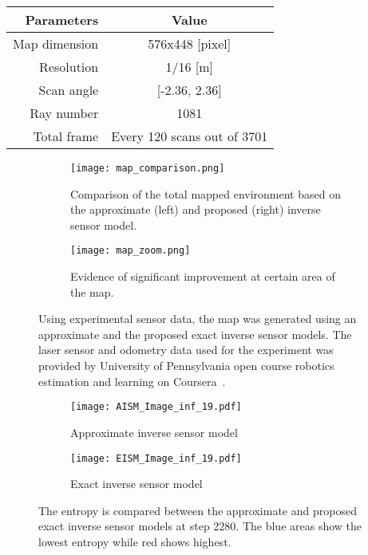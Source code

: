 \begin{center}
\label{tab:penn}
    \begin{tabular}{r | c}
        Parameters & Value\\ \hline\hline
        Map dimension & 576x448 [pixel]\\
        Resolution & 1/16 [m]\\
        Scan angle & [-2.36, 2.36]\\
        Ray number & 1081\\
        Total frame & Every 120 scans out of 3701\\
    \end{tabular}
\end{center}

\begin{figure}[!ht]
    \centering
    \begin{subfigure}[t]{0.8\columnwidth}
        \centering
        \texttt{[image: map\_comparison.png]}
        \caption{Comparison of the total mapped environment based on the approximate (left) and proposed (right) inverse sensor model.}
        \label{fig:penn_map_total}
    \end{subfigure}
    \begin{subfigure}[t]{0.8\columnwidth}
        \centering
        \texttt{[image: map\_zoom.png]}
        \caption{Evidence of significant improvement at certain area of the map.}
        \label{fig:penn_map_zoom}
    \end{subfigure}
    \caption{Using experimental sensor data, the map was generated using an approximate and the proposed exact inverse sensor models. The laser sensor and odometry data used for the experiment was provided by University of Pennsylvania open course robotics estimation and learning on Coursera~\cite{coursera}.}
    \label{fig:penn_map}
\end{figure}


\begin{figure}[!ht]
    \centering
    \begin{subfigure}[t]{0.35\columnwidth}
        \centering
        \texttt{[image: AISM\_Image\_inf\_19.pdf]}
        \caption{Approximate inverse sensor model}
        \label{fig:AISM}
    \end{subfigure}
    \begin{subfigure}[t]{0.35\columnwidth}
        \centering
        \texttt{[image: EISM\_Image\_inf\_19.pdf]}
        \caption{Exact inverse sensor model}
        \label{fig:EISM}
    \end{subfigure}
    \caption{The entropy is compared between the approximate and proposed exact inverse sensor models at step 2280. The blue areas show the lowest entropy while red shows highest.}
    \label{fig:entropy_comp}
\end{figure}


